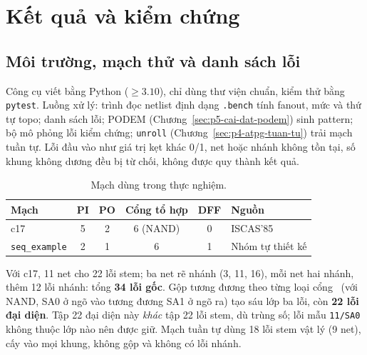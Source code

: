 \chapter{Kết quả và kiểm chứng}
\label{sec:p6-ket-qua}

\section{Môi trường, mạch thử và danh sách lỗi}
\label{sec:p6-mach-loi}
Công cụ viết bằng Python ($\ge 3.10$), chỉ dùng thư viện chuẩn, kiểm thử bằng
\texttt{pytest}. Luồng xử lý: trình đọc netlist định dạng \texttt{.bench} tính fanout, mức và thứ
tự topo; danh sách lỗi; PODEM (Chương~\ref{sec:p5-cai-dat-podem}) sinh pattern;
bộ mô phỏng lỗi kiểm chứng; \texttt{unroll} (Chương~\ref{sec:p4-atpg-tuan-tu})
trải mạch tuần tự. Lỗi đầu vào như giá trị kẹt khác 0/1, net hoặc nhánh không
tồn tại, số khung không dương đều bị từ chối, không được quy thành kết quả.
\begin{table}[H]
\centering
\caption{Mạch dùng trong thực nghiệm.}
\label{tab:p6-mach}
\begin{tabular}{@{}lccccl@{}}
\toprule
Mạch & PI & PO & Cổng tổ hợp & DFF & Nguồn\\
\midrule
c17 & 5 & 2 & 6 (NAND) & 0 & ISCAS'85~\cite{p6_brglez1985}\\
\texttt{seq\_example} & 2 & 1 & 6 & 1 & Nhóm tự thiết kế\\
\bottomrule
\end{tabular}
\end{table}
Với c17, 11 net cho 22 lỗi stem; ba net rẽ nhánh (3, 11, 16), mỗi net hai
nhánh, thêm 12 lỗi nhánh: tổng \textbf{34 lỗi gốc}. Gộp tương đương theo từng
loại cổng~\cite[pp.~12--14]{p1_wang2006} (với NAND, SA0 ở ngõ vào tương đương
SA1 ở ngõ ra) tạo sáu lớp ba lỗi, còn \textbf{22 lỗi đại diện}. Tập 22 đại
diện này \emph{khác} tập 22 lỗi stem, dù trùng số; lỗi mẫu \texttt{11/SA0}
không thuộc lớp nào nên được giữ. Mạch tuần tự dùng 18 lỗi stem vật lý (9 net),
cấy vào mọi khung, không gộp và không có lỗi nhánh.

